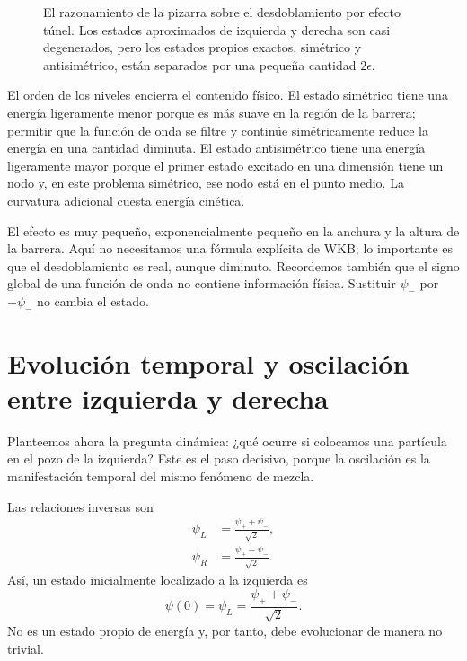 \begin{figure}
\centering
{}
\caption{El razonamiento de la pizarra sobre el desdoblamiento por efecto túnel. Los estados aproximados de izquierda y derecha son casi degenerados, pero los estados propios exactos, simétrico y antisimétrico, están separados por una pequeña cantidad \(2\epsilon\).}
\end{figure}

El orden de los niveles encierra el contenido físico. El estado simétrico tiene una energía ligeramente menor porque es más suave en la región de la barrera; permitir que la función de onda se filtre y continúe simétricamente reduce la energía en una cantidad diminuta. El estado antisimétrico tiene una energía ligeramente mayor porque el primer estado excitado en una dimensión tiene un nodo y, en este problema simétrico, ese nodo está en el punto medio. La curvatura adicional cuesta energía cinética.

El efecto es muy pequeño, exponencialmente pequeño en la anchura y la altura de la barrera. Aquí no necesitamos una fórmula explícita de WKB; lo importante es que el desdoblamiento es real, aunque diminuto. Recordemos también que el signo global de una función de onda no contiene información física. Sustituir \(\psi_-\) por \(-\psi_-\) no cambia el estado.

\section{Evolución temporal y oscilación entre izquierda y derecha}

Planteemos ahora la pregunta dinámica: ¿qué ocurre si colocamos una partícula en el pozo de la izquierda? Este es el paso decisivo, porque la oscilación es la manifestación temporal del mismo fenómeno de mezcla.

Las relaciones inversas son
\begin{align}
\psi_L &= \frac{\psi_+ + \psi_-}{\sqrt{2}},\\
\psi_R &= \frac{\psi_+ - \psi_-}{\sqrt{2}}.
\end{align}
Así, un estado inicialmente localizado a la izquierda es
\begin{equation}
\psi(0)=\psi_L=\frac{\psi_+ + \psi_-}{\sqrt{2}}.
\end{equation}
No es un estado propio de energía y, por tanto, debe evolucionar de manera no trivial.

